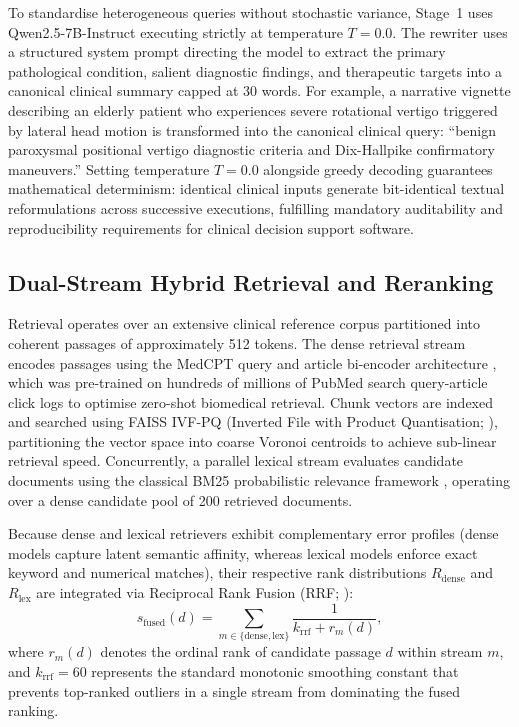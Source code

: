\documentclass[preprint,12pt,a4paper]{elsarticle}
\begin{document}
To standardise heterogeneous queries without stochastic variance, Stage~1
uses Qwen2.5-7B-Instruct executing strictly at temperature $T=0.0$. The rewriter
uses a structured system prompt directing the model to extract the primary
pathological condition, salient diagnostic findings, and therapeutic targets into
a canonical clinical summary capped at 30 words. For example, a narrative
vignette describing an elderly patient who experiences severe rotational vertigo triggered
by lateral head motion is transformed into the canonical clinical query: ``benign paroxysmal
positional vertigo diagnostic criteria and Dix-Hallpike confirmatory maneuvers.'' Setting
temperature $T=0.0$ alongside greedy decoding guarantees mathematical determinism: identical
clinical inputs generate bit-identical textual reformulations across successive executions,
fulfilling mandatory auditability and reproducibility requirements for clinical decision
support software.

\subsection{Dual-Stream Hybrid Retrieval and Reranking}
\label{sec:retrieval_method}

Retrieval operates over an extensive clinical reference corpus partitioned into coherent
passages of approximately 512 tokens. The dense retrieval stream encodes passages using
the MedCPT query and article bi-encoder architecture \citep{jin2023medcpt}, which was
pre-trained on hundreds of millions of PubMed search query-article click logs to optimise
zero-shot biomedical retrieval. Chunk vectors are indexed and searched using FAISS IVF-PQ
(Inverted File with Product Quantisation; \citealp{johnson2024faiss}), partitioning the
vector space into coarse Voronoi centroids to achieve sub-linear retrieval speed.
Concurrently, a parallel lexical stream evaluates candidate documents using the classical
BM25 probabilistic relevance framework \citep{robertson2009bm25}, operating over a dense
candidate pool of 200 retrieved documents.

Because dense and lexical retrievers exhibit complementary error profiles (dense models
capture latent semantic affinity, whereas lexical models enforce exact keyword and numerical
matches), their respective rank distributions $R_{\text{dense}}$ and $R_{\text{lex}}$
are integrated via Reciprocal Rank Fusion (RRF; \citealp{cormack2009rrf}):
\begin{equation}
  s_{\text{fused}}(d) = \sum_{m \in \{\text{dense}, \text{lex}\}} \frac{1}{k_{\text{rrf}} + r_m(d)},
  \label{eq:rrf}
\end{equation}
where $r_m(d)$ denotes the ordinal rank of candidate passage $d$ within stream $m$, and
$k_{\text{rrf}}=60$ represents the standard monotonic smoothing constant that prevents
top-ranked outliers in a single stream from dominating the fused ranking.
\end{document}
